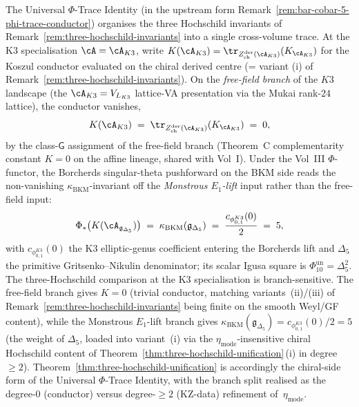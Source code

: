 \begin{remark}
\label{rem:hoch-trinity-phi-trace}
%
%
%
The Universal $\Phi$-Trace Identity
(in the upstream form
Remark~\ref{rem:bar-cobar-5-phi-trace-conductor}) organises the
three Hochschild invariants of
Remark~\ref{rem:three-hochschild-invariants} into a single
cross-volume trace. At the K3 specialisation
$\cA=\cA_{K3}$, write
$K(\cA_{K3})=\tr_{Z^{\mathrm{der}}_{\mathrm{ch}}(\cA_{K3})}(K_{\cA_{K3}})$
for the Koszul conductor evaluated on the chiral derived centre
(= variant (i) of Remark~\ref{rem:three-hochschild-invariants}).
On the \emph{free-field branch} of the $K3$ landscape (the
$\cA_{K3}=V_{L_{K3}}$ lattice-VA presentation via the Mukai rank-$24$
lattice), the conductor vanishes,
\[
K(\cA_{K3})
\;=\;
\tr_{Z^{\mathrm{der}}_{\mathrm{ch}}(\cA_{K3})}(K_{\cA_{K3}})
\;=\;0,
\]
by the class-$\mathsf{G}$ assignment of the free-field branch
(Theorem~C complementarity constant $K=0$ on the affine lineage,
shared with Vol~I). Under the Vol~III $\Phi$-functor, the
Borcherds singular-theta pushforward on the BKM side reads the
non-vanishing $\kappa_{\mathrm{BKM}}$-invariant off the
\emph{Monstrous $E_1$-lift} input rather than the free-field input:
\[
\Phi_\ast\bigl(K(\cA_{\mathfrak{g}_{\Delta_5}})\bigr)
\;=\;
\kappa_{\mathrm{BKM}}(\mathfrak{g}_{\Delta_5})
\;=\;\frac{c_{\phi_{0,1}^{K3}}(0)}{2}\;=\;5,
\]
with $c_{\phi_{0,1}^{K3}}(0)$ the K3 elliptic-genus coefficient
entering the Borcherds lift and $\Delta_5$ the primitive
Gritsenko--Nikulin denominator; its scalar Igusa square is
$\Phi_{10}^{\mathrm{un}}=\Delta_5^2$.
The three-Hochschild comparison at the K3 specialisation is
branch-sensitive. The free-field branch gives $K=0$ (trivial conductor, matching
variants~(ii)/(iii) of Remark~\ref{rem:three-hochschild-invariants}
being finite on the smooth Weyl/GF content), while the Monstrous
$E_1$-lift branch gives
$\kappa_{\mathrm{BKM}}(\mathfrak g_{\Delta_5})=c_{\phi_{0,1}^{K3}}(0)/2=5$
(the weight of
$\Delta_5$, loaded into variant~(i) via the
$\eta_{\mathrm{mode}}$-insensitive chiral Hochschild content of
Theorem~\ref{thm:three-hochschild-unification}\,(i) in degree
$\geq 2$). Theorem~\ref{thm:three-hochschild-unification} is
accordingly the chiral-side form of the Universal
$\Phi$-Trace Identity, with the branch split realised as the
degree-$0$ (conductor) versus
degree-$\geq 2$ (KZ-data) refinement of~$\eta_{\mathrm{mode}}$.
\end{remark}

